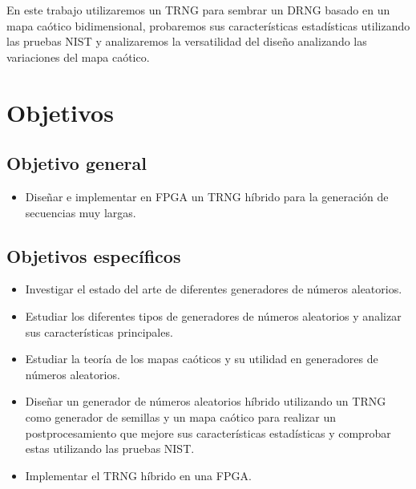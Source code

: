    En este trabajo utilizaremos un TRNG para sembrar un DRNG basado en un mapa caótico bidimensional, probaremos sus características estadísticas utilizando las pruebas NIST y analizaremos la versatilidad del diseño analizando las variaciones del mapa caótico.


    \section{Objetivos}
	
		\subsection{Objetivo general}
			\begin{itemize}
				\item Diseñar e implementar en FPGA un TRNG híbrido para la generación de secuencias muy largas.
			\end{itemize}
		
		\subsection{Objetivos específicos}
			\begin{itemize}
                \item Investigar el estado del arte de diferentes generadores de números aleatorios.
                \item Estudiar los diferentes tipos de generadores de números aleatorios y analizar sus características principales.
                \item Estudiar la teoría de los mapas caóticos y su utilidad en generadores de números aleatorios.
                \item Diseñar un generador de números aleatorios híbrido utilizando un TRNG como generador de semillas y un mapa caótico para realizar un postprocesamiento que mejore sus características estadísticas y comprobar estas utilizando las pruebas NIST.
                \item Implementar el TRNG híbrido en una FPGA.
			\end{itemize}
